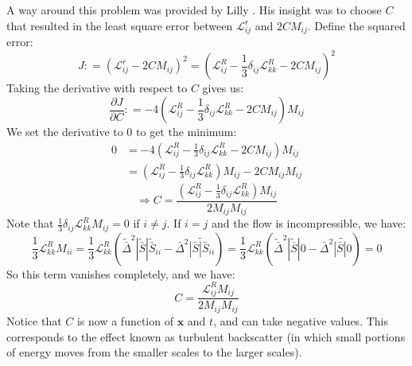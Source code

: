 \documentclass[11pt,a4paper]{article}
\begin{document}
A way around this problem was provided by Lilly \cite{Lilly1992}. His insight was to choose $C$ that resulted in the least square error between $\mathscr{L}_{ij}^r$ and $2C{M}_{ij}$. Define the squared error:
$$J : = \left(\mathscr{L}_{ij}^r -  2C{M}_{ij}\right)^2 = \left(\mathscr{L}_{ij}^R - \frac{1}{3}\delta_{ij}\mathscr{L}_{kk}^R -  2C{M}_{ij}\right)^2$$
Taking the derivative with respect to $C$ gives us:
$$\frac{\partial J}{\partial C} : = -4\left(\mathscr{L}_{ij}^R - \frac{1}{3}\delta_{ij}\mathscr{L}_{kk}^R -  2C{M}_{ij}\right)M_{ij}$$
We set the derivative to 0 to get the minimum:
\begin{align*}
0&=  -4\left(\mathscr{L}_{ij}^R - \frac{1}{3}\delta_{ij}\mathscr{L}_{kk}^R -  2C{M}_{ij}\right)M_{ij}\\
&=\left(\mathscr{L}_{ij}^R - \frac{1}{3}\delta_{ij}\mathscr{L}_{kk}^R\right)M_{ij} -  2C{M}_{ij}{M}_{ij} 
\end{align*}
$$\Rightarrow C = \frac{\left(\mathscr{L}_{ij}^R - \frac{1}{3}\delta_{ij}\mathscr{L}_{kk}^R\right)M_{ij}}{2{M}_{ij}{M}_{ij}}$$
Note that $\frac{1}{3}\delta_{ij}\mathscr{L}_{kk}^RM_{ij} = 0$ if $i\neq j$. If $i = j$ and the flow is incompressible, we have:
$$\frac{1}{3}\mathscr{L}_{kk}^RM_{ii} = \frac{1}{3}\mathscr{L}_{kk}^R\left(\tilde{\bar{\Delta}}^2|\tilde{\bar{S}}|\tilde{\bar{S}}_{ii} - \bar{\Delta}^2\widetilde{|\bar{S}|\bar{S}_{ii}}\right) = \frac{1}{3}\mathscr{L}_{kk}^R\left(\tilde{\bar{\Delta}}^2|\tilde{\bar{S}}|0- \bar{\Delta}^2\widetilde{|\bar{S}|0}\right) = 0$$
So this term vanishes completely, and we have:
\begin{equation}
C = \frac{\mathscr{L}_{ij}^R M_{ij}}{2{M}_{ij}{M}_{ij}}
\end{equation}
Notice that $C$ is now a function of $\boldsymbol{x}$ and $t$, and can take negative values. This corresponds to the effect known as turbulent backscatter (in which small portions of energy moves from the smaller scales to the larger scales).
\end{document}

